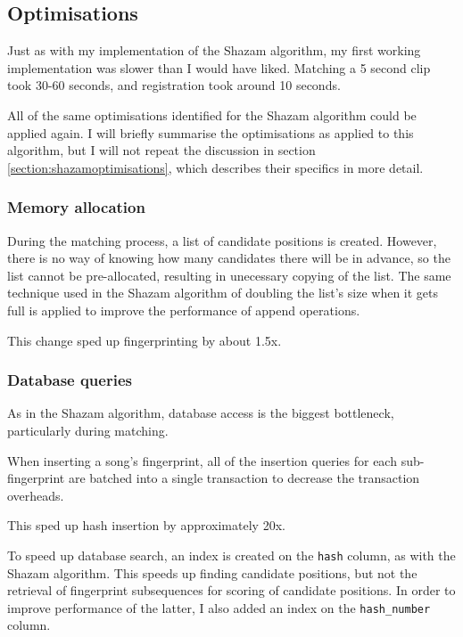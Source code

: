\documentclass[12pt,a4paper,twoside,openright]{report}
\begin{document}
\subsection{Optimisations}

Just as with my implementation of the Shazam algorithm, my first working implementation was slower than I would have liked. Matching a 5 second clip took 30-60 seconds, and registration took around 10 seconds. 

All of the same optimisations identified for the Shazam algorithm could be applied again. I will briefly summarise the optimisations as applied to this algorithm, but I will not repeat the discussion in section \ref{section:shazamoptimisations}, which describes their specifics in more detail.


\subsubsection{Memory allocation}

During the matching process, a list of candidate positions is created. However, there is no way of knowing how many candidates there will be in advance, so the list cannot be pre-allocated, resulting in unecessary copying of the list. The same technique used in the Shazam algorithm of doubling the list's size when it gets full is applied to improve the performance of append operations.

This change sped up fingerprinting by about 1.5x.

\subsubsection{Database queries}

As in the Shazam algorithm, database access is the biggest bottleneck, particularly during matching.

When inserting a song's fingerprint, all of the insertion queries for each sub-fingerprint are batched into a single transaction to decrease the transaction overheads.

This sped up hash insertion by approximately 20x.

To speed up database search, an index is created on the \lstinline{hash} column, as with the Shazam algorithm. This speeds up finding candidate positions, but not the retrieval of fingerprint subsequences for scoring of candidate positions. In order to improve performance of the latter, I also added an index on the \lstinline{hash_number} column.
\end{document}
